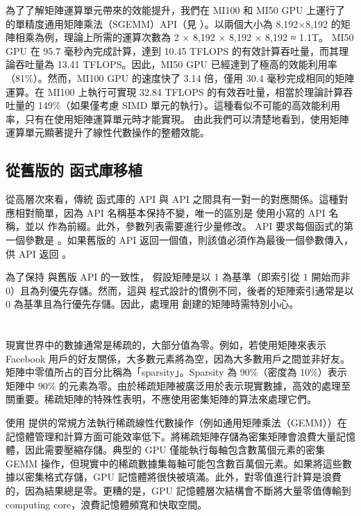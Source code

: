 為了了解矩陣運算單元帶來的效能提升，我們在 MI100 和 MI50 GPU 上運行了  的單精度通用矩陣乘法（SGEMM）API（見 ）。以兩個大小為 8,192×8,192 的矩陣相乘為例，理論上所需的運算次數為 2 × 8,192 × 8,192 × 8,192 ≈ 1.1T。
MI50 GPU 在 95.7 毫秒內完成計算，達到 10.45 TFLOPS 的有效計算吞吐量，而其理論吞吐量為 13.41 TFLOPS。因此，MI50 GPU 已經達到了極高的效能利用率（81\%）。然而，MI100 GPU 的速度快了 3.14 倍，僅用 30.4 毫秒完成相同的矩陣運算。在 MI100 上執行可實現 32.84 TFLOPS 的有效吞吐量，相當於理論計算吞吐量的 149\%（如果僅考慮 SIMD 單元的執行）。這種看似不可能的高效能利用率，只有在使用矩陣運算單元時才能實現。
由此我們可以清楚地看到，使用矩陣運算單元顯著提升了線性代數操作的整體效能。

\subsection{從舊版的  函式庫移植}
從高層次來看，傳統  函式庫的 API 與  API 之間具有一對一的對應關係。這種對應相對簡單，因為 API 名稱基本保持不變，唯一的區別是  使用小寫的 API 名稱，並以  作為前綴。此外，參數列表需要進行少量修改。 API 要求每個函式的第一個參數是 。如果舊版的 API 返回一個值，則該值必須作為最後一個參數傳入，供  API 返回 。

為了保持  與舊版  API 的一致性， 假設矩陣是以 1 為基準（即索引從 1 開始而非 0）且為列優先存儲。然而，這與  程式設計的慣例不同，後者的矩陣索引通常是以 0 為基準且為行優先存儲。因此，處理用  創建的矩陣時需特別小心。

\section{}
現實世界中的數據通常是稀疏的，大部分值為零。例如，若使用矩陣來表示 Facebook 用戶的好友關係，大多數元素將為空，因為大多數用戶之間並非好友。矩陣中零值所占的百分比稱為「sparsity」。Sparsity 為 90\%（密度為 10\%）表示矩陣中 90\% 的元素為零。由於稀疏矩陣被廣泛用於表示現實數據，高效的處理至關重要。稀疏矩陣的特殊性表明，不應使用密集矩陣的算法來處理它們。

使用  提供的常規方法執行稀疏線性代數操作（例如通用矩陣乘法（GEMM））在記憶體管理和計算方面可能效率低下。將稀疏矩陣存儲為密集矩陣會浪費大量記憶體，因此需要壓縮存儲。典型的 GPU 僅能執行每軸包含數萬個元素的密集 GEMM 操作，但現實中的稀疏數據集每軸可能包含數百萬個元素。如果將這些數據以密集格式存儲，GPU 記憶體將很快被填滿。此外，對零值進行計算是浪費的，因為結果總是零。更糟的是，GPU 記憶體層次結構會不斷將大量零值傳輸到 computing core，浪費記憶體頻寬和快取空間。

